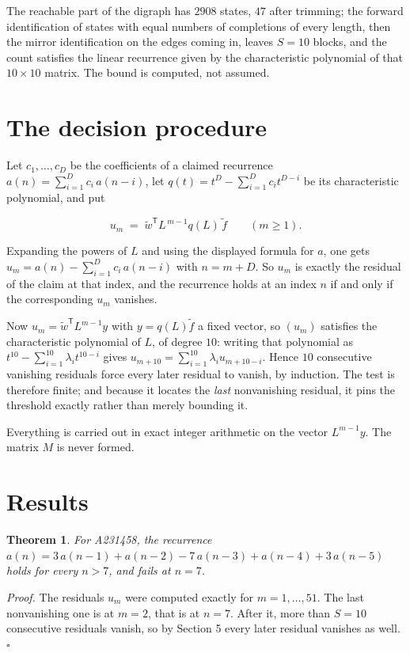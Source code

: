 \documentclass[11pt]{article}
\newtheorem{theorem}{Theorem}
\theoremstyle{definition}
\begin{document}
The reachable part of the digraph has $2908$ states, $47$ after trimming; the forward identification of states with equal numbers of completions of every length, then the mirror identification on the edges coming in, leaves $S = 10$ blocks, and the count satisfies the linear recurrence given by the characteristic polynomial of that $10\times10$ matrix. The bound is computed, not assumed.

\section{The decision procedure}

Let $c_1,\dots,c_D$ be the coefficients of a claimed recurrence $a(n) = \sum_{i=1}^{D} c_i\,a(n-i)$, let $q(t) = t^{D} - \sum_{i=1}^{D} c_i t^{D-i}$ be its characteristic polynomial, and put

\[u_m \;=\; \tilde w^{\mathsf T} L^{\,m-1} q(L)\,\tilde f \qquad (m \ge 1).\]

Expanding the powers of $L$ and using the displayed formula for $a$, one gets $u_m = a(n) - \sum_{i=1}^{D} c_i\,a(n-i)$ with $n = m + D$. So $u_m$ is exactly the residual of the claim at that index, and the recurrence holds at an index $n$ if and only if the corresponding $u_m$ vanishes.

Now $u_m = \tilde w^{\mathsf T} L^{m-1} y$ with $y = q(L)\tilde f$ a fixed vector, so $(u_m)$ satisfies the characteristic polynomial of $L$, of degree $10$: writing that polynomial as $t^{10} - \sum_{i=1}^{10} \lambda_i t^{10-i}$ gives $u_{m+10} = \sum_{i=1}^{10} \lambda_i u_{m+10-i}$. Hence $10$ consecutive vanishing residuals force every later residual to vanish, by induction. The test is therefore finite; and because it locates the {\itshape last} nonvanishing residual, it pins the threshold exactly rather than merely bounding it.

Everything is carried out in exact integer arithmetic on the vector $L^{m-1}y$. The matrix $M$ is never formed.

\section{Results}

\begin{theorem} For A231458, the recurrence $a(n) = 3\,a(n-1) + a(n-2) - 7\,a(n-3) + a(n-4) + 3\,a(n-5)$ holds for every $n > 7$, and fails at $n = 7$.\end{theorem}

{\itshape Proof.} The residuals $u_m$ were computed exactly for $m = 1,\dots,51$. The last nonvanishing one is at $m = 2$, that is at $n = 7$. After it, more than $S = 10$ consecutive residuals vanish, so by Section 5 every later residual vanishes as well. $\square$
\end{document}
